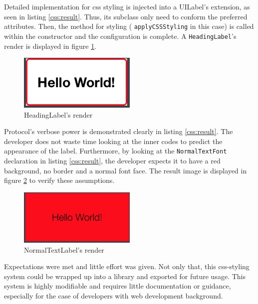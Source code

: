 \documentclass[11pt,a4paper,oneside,article]{memoir}
\begin{document}
Detailed implementation for \gls{css} styling is injected into a UILabel's extension, as seen in listing \ref{css:result}. Thus, its subclass only need to conform the preferred attributes. Then, the method for styling (  \texttt{applyCSSStyling} in this case) is called within the constructor and the configuration is complete. A \texttt{HeadingLabel}'s render is displayed in figure \ref{fig:cssResult_1}. 

\begin{figure}[h]

\centering
\includegraphics[width=0.5\textwidth]{cssResult_1}

\caption{HeadingLabel's render}
\label{fig:cssResult_1}  
\end{figure}

Protocol's verbose power is demonstrated clearly in listing \ref{css:result}. The developer does not waste time looking at the inner codes to predict the appearance of the label. Furthermore, by looking at the \texttt{NormalTextFont} declaration in listing \ref{css:result}, the developer expects it to have a red background, no border and a normal font face. The result image is displayed in figure \ref{fig:cssResult_2} to verify these assumptions.

\begin{figure}[h]

\centering
\includegraphics[width=0.5\textwidth]{cssResult_2}

\caption{NormalTextLabel's render}
\label{fig:cssResult_2}  
\end{figure}

Expectations were met and little effort was given. Not only that, this \gls{css}-styling system could be wrapped up into a library and exported for future usage. This system is highly modifiable and requires little documentation or guidance, especially for the case of developers with web development background. 
\end{document}
